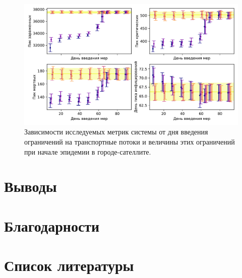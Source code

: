 \documentclass[a4paper,12pt]{article} %
\begin{document}
\begin{figure}[H]
    \centering
    \includegraphics[width=\linewidth]{images/hists1.pdf}
    \caption{Зависимости исследуемых метрик системы от дня введения ограничений на транспортные потоки и величины этих ограничений при начале эпидемии в городе-сателлите.}
\end{figure}

\cite{makhrova2017work}

\section{Выводы}
\section{Благодарности}
\section{Список литературы}


\printbibliography
\end{document}

